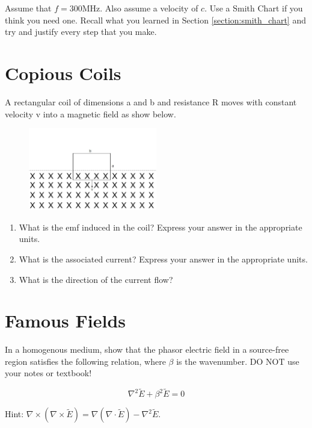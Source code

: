 \documentclass{article}
\begin{document}
Assume that $f = 300$MHz. Also assume a velocity of $c$. Use a Smith Chart if you think you need one. Recall what you learned in Section \ref{section:smith_chart} and try and justify every step that you make.
\newpage


\section{Copious Coils}
A rectangular coil of dimensions a and b and resistance R moves with constant velocity v into a magnetic field as show below.

\begin{figure}[H]
\begin{center}
    \includegraphics[width= 0.5\textwidth]{figures/square.jpg}
\end{center}
\end{figure}
\begin{enumerate}
    \item What is the emf induced in the coil? Express your answer in the appropriate units.
    \item What is the associated current? Express your answer in the appropriate units.
    \item What is the direction of the current flow?
\end{enumerate}
\vfill

\newpage

\section{Famous Fields}

In a homogenous medium, show that the phasor electric field in a source-free region satisfies the following relation, where $\beta$ is the wavenumber. DO NOT use your notes or textbook!

\[
\nabla^2 \tilde{E} + \beta^2\tilde{E} = 0
\]

Hint: $\nabla\times(\nabla\times \tilde{E}) = \nabla(\nabla \cdot \tilde{E}) - \nabla^2 \tilde{E}$.

\vfill
\end{document}
